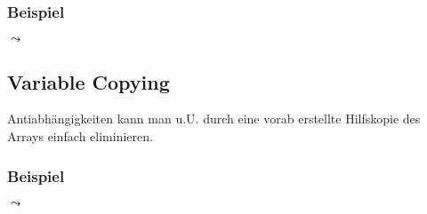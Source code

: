 \subsubsection{Beispiel}
\begin{minipage}{.4\textwidth}
\begin{algorithm}[H]
\SetLine
{}
\end{algorithm}
\end{minipage}
\begin{minipage}{.5\textwidth}
\qquad $\leadsto$ \qquad
\begin{algorithm}[H]
\SetLine
{}
\end{algorithm}
\end{minipage}
\subsection{Variable Copying}

Antiabhängigkeiten kann man u.U. durch eine vorab erstellte Hilfskopie
des Arrays einfach eliminieren.

\subsubsection{Beispiel}
\begin{minipage}{.4\textwidth}
\begin{procedure}[H]
\SetLine
{}
\end{procedure}
\end{minipage}
\qquad $\leadsto$ \qquad
\begin{minipage}{.5\textwidth}
\begin{procedure}[H]
\SetLine
{}
\end{procedure}

\begin{procedure}[H]
\SetLine
{}
\end{procedure}
\end{minipage}

